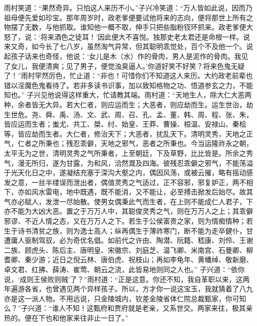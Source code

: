 \documentclass[12pt,oneside]{book}
\begin{document}
雨村笑道：“果然奇异。只怕这人来历不小。”子兴冷笑道：“万人皆如此说，因而乃祖母便先爱如珍宝。那年周岁时，政老爹便要试他将来的志向，便将那世上所有之物摆了无数，与他抓取。谁知他一概不取，伸手只把些脂粉钗环抓来。政老爹便大怒了，说：‘将来酒色之徒耳！’因此便大不喜悦。独那史老太君还是命根一样。说来又奇，如今长了七八岁，虽然淘气异常，但其聪明乖觉处，百个不及他一个。说起孩子话来也奇怪，他说：‘女儿是木（水）作的骨肉，男人是泥作的骨肉。我见了女儿，我便清爽；见了男子，便觉浊臭逼人。’你道好笑不好笑？将来色鬼无疑了！”雨村罕然厉色，忙止道：“非也！可惜你们不知道这人来历。大约政老前辈也错以淫魔色鬼看待了。若非多读书识事，加以致知格物之功、悟道参玄之力，不能知也。”
子兴见他说得这样重大，忙请教其端。雨村道：“天地生人，除大仁大恶两种，余者皆无大异。若大仁者，则应运而生；大恶者，则应劫而生。运生世治，劫生世危。尧、舜、禹、汤、文、武、周、召、孔、孟、董、韩、周、程、张、朱，皆应运而生者；蚩尤、共工、桀、纣、始皇、王莽、曹操、桓温、安禄山、秦桧等，皆应劫而生者。大仁者，修治天下；大恶者，扰乱天下。清明灵秀，天地之正气，仁者之所秉也；残忍乖僻，天地之邪气，恶者之所秉也。今当运隆祚永之朝，太平无为之世，清明灵秀之气所秉者，上至朝廷，下及草野，比比皆是。所余之秀气，漫无所归，遂为甘露，为和风，洽然溉及四海。彼残忍乖僻之邪气，不能荡溢于光天化日之中，遂凝结充塞于深沟大壑之内，偶因风荡，或被云摧，略有摇动感发之意，一丝半缕误而泄出者，偶值灵秀之气适过，正不容邪，邪复妒正，两不相下，亦如风水雷电，地中既遇，既不能消，又不能让，必至搏击掀发后始尽。故其气亦必赋人，发泄一尽始散。使男女偶秉此气而生者，在上则不能成仁人君子，下亦不能为大凶大恶。置之于万万人中，其聪俊灵秀之气，则在万万人之上；其乖僻邪谬、不近人情之态，又在万万人之下。若生于公侯富贵之家，则为情痴情种；若生于诗书清贫之族，则为逸士高人；纵再偶生于薄祚寒门，断不能为走卒健仆，甘遭庸人驱制驾驭，必为奇优名倡。如前代之许由、陶潜、阮籍、嵇康、刘伶、王谢二族、顾虎头、陈后主、唐明皇、宋徽宗、刘庭芝、温飞卿、米南宫、石曼卿、柳耆卿、秦少游；近日之倪云林、唐伯虎、祝枝山；再如李龟年、黄幡绰、敬新磨、卓文君、红拂、薛涛、崔莺、朝云之流，此皆易地则同之人也。”
子兴道：“依你说，‘成则王侯败则贼’了？”雨村道：“正是这意。你还不知，我自革职以来，这两年遍游各省，也曾遇见两个异样孩子。所以，方才你一说这宝玉，我就猜着了八九亦是这一派人物。不用远说，只金陵城内，钦差金陵省体仁院总裁甄家，你可知么？”子兴道：“谁人不知！这甄府和贾府就是老亲，又系世交。两家来往，极其亲热的。便在下也和他家来往非止一日了。”
\end{document}
